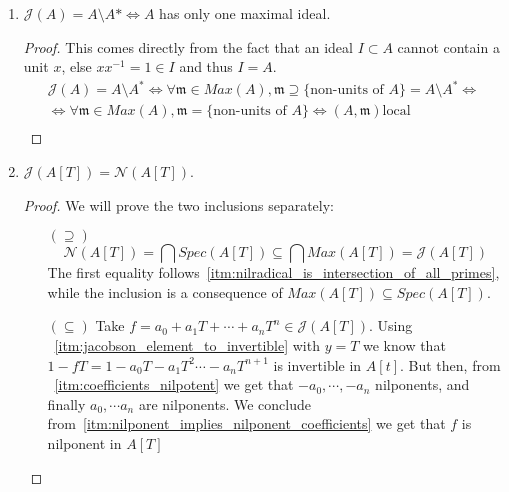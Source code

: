 \begin{problem}
\begin{enumerate}[label=(\theproblem.\arabic*),ref=\theproblem.\arabic*]
        \item $\mathcal{J}(A) = A \setminus A* \Leftrightarrow A$ has only one maximal ideal.
            \begin{sol}
                \begin{proof}
                    This comes directly from the fact that an ideal $I \subset A$ cannot contain a unit $x$, else $x x^{-1} = 1 \in I$ and thus $I = A$.
                    \begin{gather*}
                        \mathcal{J}(A) = A \setminus A^* \Leftrightarrow \forall \mathfrak{m} \in Max(A), \mathfrak{m} \supseteq \{\text{non-units of }A\} = A \setminus A^* \Leftrightarrow\\
                        \Leftrightarrow \forall \mathfrak{m} \in Max(A), \mathfrak{m} = \{\text{non-units of }A\} \Leftrightarrow (A, \mathfrak{m}) \text{local}\\
                    \end{gather*}
                \end{proof}
            \end{sol}

        \item \label{itm:nilradical_equals_jacobson_in_polynomial_ring}
        $\mathcal{J}(A[T]) = \mathcal{N}(A[T])$.
            \begin{sol}
                \begin{proof}
                We will prove the two inclusions separately:
                    \begin{itemize}
                        \item[$(\supseteq)$]
                        \[ \mathcal{N}(A[T]) = \bigcap Spec(A[T]) \subseteq \bigcap Max(A[T]) = \mathcal{J}(A[T]) \]
                        The first equality follows~\ref{itm:nilradical_is_intersection_of_all_primes}, while the inclusion is a consequence of $Max(A[T]) \subseteq Spec(A[T])$.
                        \item[$(\subseteq)$]
                        Take $f = a_0 + a_1 T + \cdots + a_n T^n \in \mathcal{J}(A[T])$.
                        Using ~\ref{itm:jacobson_element_to_invertible} with $y = T$ we know that $1 - f T = 1 - a_0 T - a_1 T^2 \cdots - a_n T^{n + 1}$ is invertible in $A[t]$.
                        But then, from ~\ref{itm:coefficients_nilpotent} we get that $-a_0, \cdots, -a_n$ nilponents, and finally $a_0, \cdots a_n$ are nilponents.
                        We conclude from~\ref{itm:nilponent_implies_nilponent_coefficients} we get that $f$ is nilponent in $A[T]$
                    \end{itemize}
                \end{proof}
            \end{sol}
    \end{enumerate}
\end{problem}
